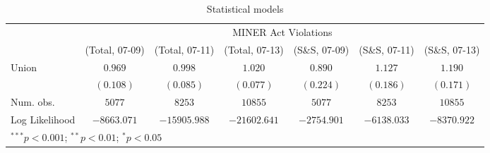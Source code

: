 
\begin{table}
\begin{center}
\begin{tabular}{l c c c c c c}
\hline
 & \multicolumn{6}{c}{MINER Act Violations} \\
\cline{2-7}
 & (Total, 07-09) & (Total, 07-11) & (Total, 07-13) & (S\&S, 07-09) & (S\&S, 07-11) & (S\&S, 07-13) \\
\hline
Union          & $0.969$     & $0.998$      & $1.020$      & $0.890$     & $1.127$     & $1.190$     \\
               & $(0.108)$   & $(0.085)$    & $(0.077)$    & $(0.224)$   & $(0.186)$   & $(0.171)$   \\
\hline
Num. obs.      & $5077$      & $8253$       & $10855$      & $5077$      & $8253$      & $10855$     \\
Log Likelihood & $-8663.071$ & $-15905.988$ & $-21602.641$ & $-2754.901$ & $-6138.033$ & $-8370.922$ \\
\hline
\multicolumn{7}{l}{\scriptsize{$^{***}p<0.001$; $^{**}p<0.01$; $^{*}p<0.05$}}
\end{tabular}
\caption{Statistical models}
\label{table:coefficients}
\end{center}
\end{table}

